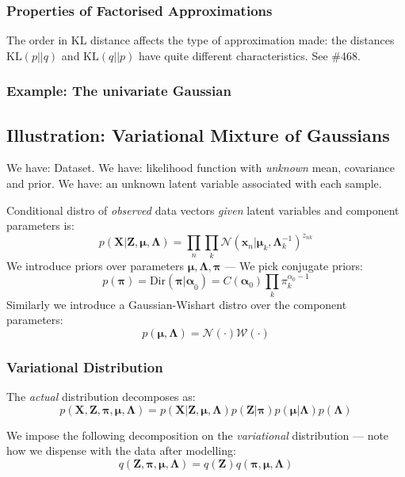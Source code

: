 \documentclass[a4paper]{article}
\newcommand{\mb}{\mathbf}
\newcommand{\bs}{\boldsymbol}
\begin{document}
\subsubsection{Properties of Factorised Approximations}
The order in KL distance affects the type of approximation made: the distances $\text{KL}(p||q)$ and $\text{KL}(q||p)$ have quite different characteristics. See \#468.

\subsubsection{Example: The univariate Gaussian}

\subsection{Illustration: Variational Mixture of Gaussians}
We have: Dataset.
We have: likelihood function with \textit{unknown} mean, covariance and prior.
We have: an unknown latent variable associated with each sample.

Conditional distro of \textit{observed} data vectors \textit{given} latent variables and component parameters is:
%
\begin{equation}
p(\mb{X}|\mb{Z,\mu,\Lambda}) = \prod_n \prod_k \mathcal{N}(\mb{x}_n|\bs{\mu}_k,\bs{\Lambda}_k^{-1})^{z_{nk}}
\end{equation}
%
%
We introduce priors over parameters $\bs{\mu, \Lambda, \pi}$ \---- We pick conjugate priors:
%
%
\begin{equation}
p(\bs{\pi}) = \text{Dir}(\bs{\pi|\alpha}_0) = C(\bs{\alpha}_0)\prod_k \pi_k^{\alpha_0-1}
\end{equation}
%
%
Similarly we introduce a Gaussian-Wishart distro over the component parameters:
%
%
\begin{equation}
p(\bs{\mu,\Lambda}) =\mathcal{N}(\cdot)\mathcal{W}(\cdot)
\end{equation}

\subsubsection{Variational Distribution}
The \textit{actual} distribution decomposes as:
\begin{equation}
p(\mb{X,Z},\bs{\pi,\mu},\bs{\Lambda}) = p(\mb{X|Z},\bs{\mu,\Lambda})p(\mb{Z}|\bs{\pi})p(\bs{\mu|\Lambda})p(\bs{\Lambda})
\end{equation}

We impose the following decomposition on the \textit{variational} distribution \---- note how we dispense with the data after modelling:
\begin{equation}
q(\mb{Z},\bs{\pi,\mu,\Lambda}) = q(\mb{Z})q(\bs{\pi,\mu,\Lambda})
\end{equation}
\end{document}
